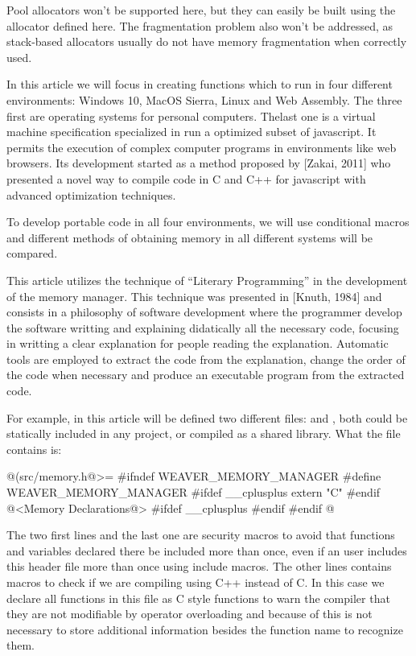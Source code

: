 Pool allocators won't be supported here, but they can easily be built
using the allocator defined here. The fragmentation problem also won't
be addressed, as stack-based allocators usually do not have memory
fragmentation when correctly used.


In this article we will focus in creating functions which to run in
four different environments: Windows 10, MacOS Sierra, Linux and Web
Assembly. The three first are operating systems for personal
computers. Thelast one is a virtual machine specification specialized
in run a optimized subset of javascript. It permits the execution of
complex computer programs in environments like web browsers. Its
development started as a method proposed by [Zakai, 2011] who
presented a novel way to compile code in C and C++ for javascript with
advanced optimization techniques.

To develop portable code in all four environments, we will use
conditional macros and different methods of obtaining memory in all
different systems will be compared.


This article utilizes the technique of ``Literary Programming'' in the
development of the memory manager. This technique was presented in
[Knuth, 1984] and consists in a philosophy of software development
where the programmer develop the software writting and explaining
didatically all the necessary code, focusing in writting a clear
explanation for people reading the explanation. Automatic tools are
employed to extract the code from the explanation, change the order of
the code when necessary and produce an executable program from the
extracted code.

For example, in this article will be defined two different files:
 and , both could be statically
included in any project, or compiled as a shared library. What the file
 contains is:

\iniciocodigo
@(src/memory.h@>=
#ifndef WEAVER_MEMORY_MANAGER
#define WEAVER_MEMORY_MANAGER
#ifdef __cplusplus
extern "C" {
#endif
@<Memory Declarations@>
#ifdef __cplusplus
}
#endif
#endif
@
\fimcodigo

The two first lines and the last one are security macros to avoid that
functions and variables declared there be included more than once,
even if an user includes this header file more than once using include
macros. The other lines contains macros to check if we are compiling
using C++ instead of C. In this case we declare all functions in this
file as C style functions to warn the compiler that they are not
modifiable by operator overloading and because of this is not
necessary to store additional information besides the function name to
recognize them.

